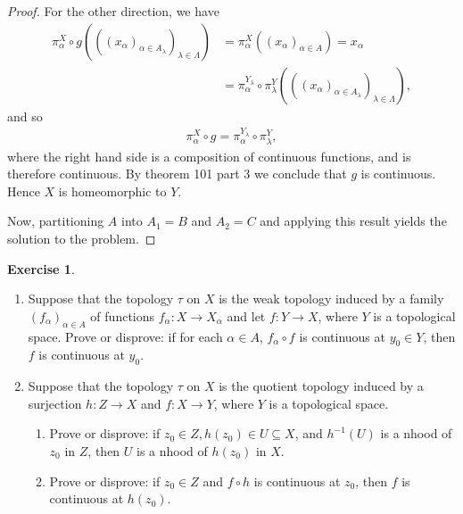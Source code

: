 \documentclass[12pt]{extarticle}
\newcommand{\<}{\langle}
\renewcommand{\>}{\rangle}
\theoremstyle{definition}
\newtheorem{exercise}{Exercise}
\begin{document}
\begin{proof}
  For the other direction, we have
  \begin{align*}
    \pi_{\alpha}^X \circ g (((x_{\alpha})_{\alpha \in A_{\lambda}})_{\lambda \in \Lambda}) &= \pi_{\alpha}^X((x_{\alpha})_{\alpha \in A}) = x_{\alpha} \\
    &= \pi_{\alpha}^{Y_{\lambda}} \circ \pi_{\lambda}^Y (((x_{\alpha})_{\alpha \in A_{\lambda}})_{\lambda \in \Lambda}),
  \end{align*}
  and so
  \begin{align*}
    \pi_{\alpha}^X \circ g = \pi_{\alpha}^{Y_{\lambda}} \circ \pi_{\lambda}^Y,
  \end{align*}
  where the right hand side is a composition of continuous functions, and is therefore continuous. By theorem 101 part 3 we conclude that $g$ is continuous. Hence $X$ is homeomorphic to $Y$.

  Now, partitioning $A$ into $A_{1} = B$ and $A_{2} = C$ and applying this result yields the solution to the problem. 
\end{proof}

\begin{exercise}
  \begin{enumerate}
  \item
    Suppose that the topology $\tau$ on $X$ is the weak topology induced by a family $(f_{\alpha})_{\alpha \in A}$ of functions $f_{\alpha}: X \to X_{\alpha}$ and let
    $f: Y \to X$, where $Y$ is a topological space. Prove or disprove: if for each $\alpha \in A$, $f_{\alpha} \circ f$ is continuous at $y_0 \in Y$,
    then $f$ is continuous at $y_0$.
  \item
    Suppose that the topology $\tau$ on $X$ is the quotient topology induced by a surjection $h:Z \to X$ and $f:X \to Y$, where $Y$ is a topological space.
    \begin{enumerate}
    \item
      Prove or disprove: if $z_0 \in Z, h(z_0) \in U \subseteq X$, and $h^{-1}(U)$ is a nhood of $z_0$ in $Z$, then $U$ is a nhood of $h(z_0)$ in $X$.
    \item
      Prove or disprove: if $z_0 \in Z$ and $f \circ h$ is continuous at $z_0$, then $f$ is continuous at $h(z_0)$. 
    \end{enumerate}
  \end{enumerate}
\end{exercise}
\end{document}
